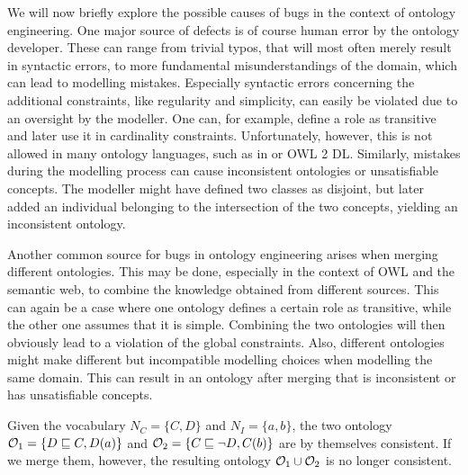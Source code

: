 We will now briefly explore the possible causes of bugs in the context of ontology engineering. One major source of defects is of course human error by the ontology developer. These can range from trivial typos, that will most often merely result in syntactic errors, to more fundamental misunderstandings of the domain, which can lead to modelling mistakes. Especially syntactic errors concerning the additional constraints, like regularity and simplicity, can easily be violated due to an oversight by the modeller. One can, for example, define a role as transitive and later use it in cardinality constraints. Unfortunately, however, this is not allowed in many ontology languages, such as in \SROIQ or OWL 2 DL. Similarly, mistakes during the modelling process can cause inconsistent ontologies or unsatisfiable concepts. The modeller might have defined two classes as disjoint, but later added an individual belonging to the intersection of the two concepts, yielding an inconsistent ontology.

Another common source for bugs in ontology engineering arises when merging different ontologies. This may be done, especially in the context of OWL and the semantic web, to combine the knowledge obtained from different sources. This can again be a case where one ontology defines a certain role as transitive, while the other one assumes that it is simple. Combining the two ontologies will then obviously lead to a violation of the global constraints. Also, different ontologies might make different but incompatible modelling choices when modelling the same domain. This can result in an ontology after merging that is inconsistent or has unsatisfiable concepts.

\begin{example}
  Given the vocabulary $N_C = \{ C, D \}$ and $N_I = \{ a, b \}$, the two \SROIQ ontology $\mathcal{O}_1 = \{ D \sqsubseteq C, D(a) \}$ and $\mathcal{O}_2 = \{ C \sqsubseteq \lnot D, C(b) \}$ are by themselves consistent. If we merge them, however, the resulting ontology $\mathcal{O}_1 \cup \mathcal{O}_2$ is no longer consistent.
\end{example}
